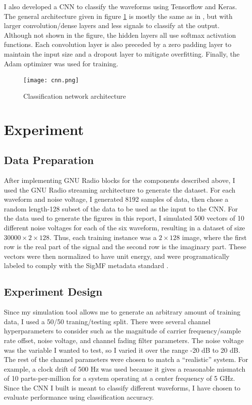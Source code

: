 \documentclass{article}
\begin{document}
I also developed a CNN to classify the waveforms using Tensorflow and Keras.
The general architecture given in figure \ref{fig:cnn} is mostly the same as in
\cite{OShea2016a}, but with larger convolution/dense layers and less signals to
classify at the output. Although not shown in the figure, the hidden layers all
use softmax activation functions. Each convolution layer is also preceded by a
zero padding layer to maintain the input size and a dropout layer to mitigate
overfitting. Finally, the Adam optimizer \cite{kingma2017} was used for training.

\begin{figure}[H]
    \centering
    \texttt{[image: cnn.png]}
    \caption{Classification network architecture}
    \label{fig:cnn}
\end{figure}
\section{Experiment}

\subsection{Data Preparation}
After implementing GNU Radio blocks for the components described above, I used
the GNU Radio streaming architecture to generate the dataset. For each waveform
and noise voltage, I generated 8192 samples of data, then chose a random
length-128 subset of the data to be used as the input to the CNN. For the data
used to generate the figures in this report, I simulated 500 vectors of 10 different noise
voltages for each of the six waveform, resulting in a dataset of size $30000 \times 2
\times 128$. Thus, each training instance was a $2 \times 128$ image, where the
first row is the real part of the signal and the second row is the imaginary
part. These vectors were then normalized to have unit energy, and were
programatically labeled to comply with the SigMF metadata standard \cite{Hillburn2018}.

\subsection{Experiment Design}

Since my simulation tool allows me to generate an arbitrary amount of training data, I
used a 50/50 traning/testing split. There were several channel hyperparameters
to consider such as the magnitude of carrier frequency/sample rate offset, noise
voltage, and channel fading filter parameters. The noise voltage was the
variable I wanted to test, so I varied it over the range -20 dB to 20 dB. The
rest of the channel parameters were chosen to match a ``realistic'' system. For
example, a clock drift of 500 Hz was used because it gives a reasonable mismatch
of 10 parts-per-million for a system operating at a center frequency of 5 GHz.
Since the CNN I built is meant to classify different waveforms, I have chosen to
evaluate performance using classification accuracy.
\end{document}
